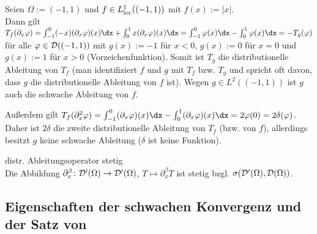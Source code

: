 \begin{Bsp}
    Seien $\Omega := (-1, 1)$ und $f \in L^1_{\text{loc}}((-1, 1))$ mit $f(x) := |x|$.\\
    Dann gilt $T_f(\partial_x \varphi) = \int_{-1}^0 (-x)(\partial_x \varphi)(x) \dx +
    \int_0^1 x (\partial_x \varphi)(x) \dx = \int_{-1}^0 \varphi(x) \dx - \int_0^1 \varphi(x)\dx
    = -T_g(\varphi)$ für alle $\varphi \in \mathcal{D}((-1, 1))$ mit
    $g(x) := -1$ für $x < 0$, $g(x) := 0$ für $x = 0$ und $g(x) := 1$ für $x > 0$
    (Vorzeichenfunktion).
    Somit ist $T_g$ die distributionelle Ableitung von $T_f$
    (man identifiziert $f$ und $g$ mit $T_f$ bzw. $T_g$ und spricht oft davon,
    dass $g$ die distributionelle Ableitung von $f$ ist).
    Wegen $g \in L^2((-1, 1))$ ist $g$ auch die schwache Ableitung von $f$.
    
    Außerdem gilt
    $T_f(\partial_x^2 \varphi) =
    \int_{-1}^0 (\partial_x \varphi)(x)\dx - \int_0^1 (\partial_x \varphi)(x) \dx =
    2\varphi(0) = 2\delta(\varphi)$.
    Daher ist $2\delta$ die zweite distributionelle Ableitung von $T_f$ (bzw. von $f$),
    allerdings besitzt $g$ keine schwache Ableitung ($\delta$ ist keine Funktion).
\end{Bsp}

\begin{Satz}{distr. Ableitungsoperator stetig}\\
    Die Abbildung $\partial^\beta_x\colon \mathcal{D}'(\Omega) \rightarrow \mathcal{D}'(\Omega)$,
    $T \mapsto \partial^\beta_x T$ ist stetig bzgl. $\sigma(\mathcal{D}'(\Omega), \mathcal{D}(\Omega))$.
\end{Satz}

\pagebreak

\subsection{%
    Eigenschaften der schwachen Konvergenz und der Satz von %
}

